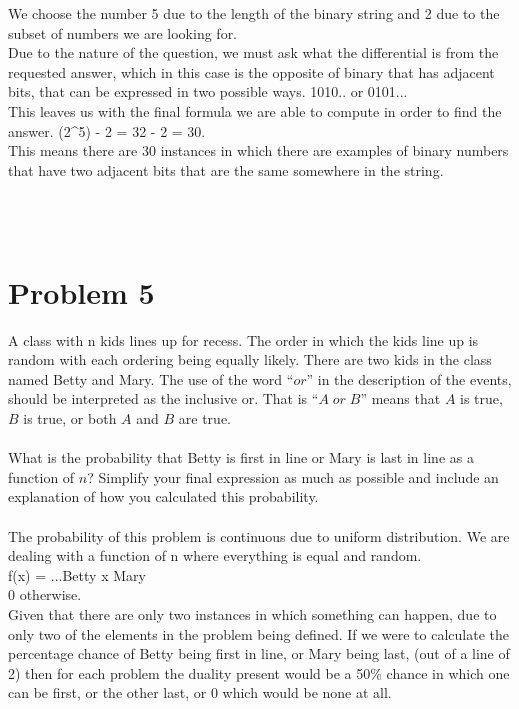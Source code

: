 \begin{enumerate}[label=(\alph*)]
  We choose the number 5 due to the length of the binary string and 2 due to the subset of numbers we are looking for. \\
  
  Due to the nature of the question, we must ask what the differential is from the requested answer, which in this case is the opposite of binary that has adjacent bits, that can be expressed in two possible ways. 1010.. or 0101... \\
  
  This leaves us with the final formula we are able to compute in order to find the answer. (2^5) - 2 = 32 - 2 = 30. \\
  
  This means there are 30 instances in which there are examples of binary numbers that have two adjacent bits that are the same somewhere in the string.
  
\\\\
  \end{enumerate}
\newpage
  \section*{Problem 5}
  A class with n kids lines up for recess. The order in which the kids line up is random with each ordering being equally likely. There are two kids in the class named Betty and Mary. The use of the word ``$or$'' in the description of the events, should be interpreted as the inclusive or. That is ``$A \;or\; B$'' means that $A$ is true, $B$ is true, or both $A$ and $B$ are true.\\\\
  What is the probability that Betty is first in line or Mary is last in line as a function of $n$? Simplify your final expression as much as possible and include an explanation of how you calculated this probability.
\\\\
  The probability of this problem is continuous due to uniform distribution. We are dealing with a function of n where everything is equal and random. \\
  
  f(x) = ...Betty \leq x \leq Mary \\
  
  0 otherwise.\\
  
  Given that there are only two instances in which something can happen, due to only two of the elements in the problem being defined. If we were to calculate the percentage chance of Betty being first in line, or Mary being last, (out of a line of 2) then for each problem the duality present would be a 50\% chance in which one can be first, or the other last, or 0 which would be none at all. \\
  
